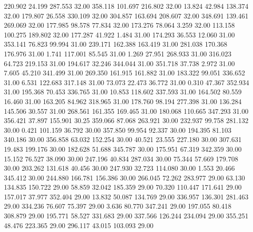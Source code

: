  220.902   24.199  287.553        32.00
 358.118  101.697  216.802        32.00
  13.824   42.984  138.374        32.00
 179.807   26.558  330.109        32.00
 304.857  163.694  208.607        32.00
 348.691  139.461  269.069        32.00
 177.985   98.578   77.834        32.00
 173.276   78.064    3.259        32.00
 113.158  100.275  189.802        32.00
 177.287   41.922    1.484        31.00
 174.293   36.553   12.060        31.00
 353.141   76.823   99.994        31.00
 239.171  162.388  163.419        31.00
 281.038  170.368  176.976        31.00
   1.741  117.001   85.545        31.00
   1.269   27.951  268.933        31.00
 316.023   64.723  219.153        31.00
 194.617   32.246  344.044        31.00
 351.718   37.738    2.972        31.00
   7.605   45.210  341.499        31.00
 269.350  161.915  161.882        31.00
 183.322   99.051  336.652        31.00
   6.531  122.683  317.148        31.00
  73.073   22.473   36.772        31.00
   0.310   47.367  352.934        31.00
 195.368   70.453  336.765        31.00
  10.853  118.602  337.593        31.00
 164.502   80.559   16.460        31.00
 163.205   84.962  318.965        31.00
 178.760   98.194  277.398        31.00
 136.284  145.506   30.557        31.00
 268.561  161.355  169.465        31.00
 180.068  110.665  347.293        31.00
 356.421   37.897  155.901        30.25
 359.066   87.068  263.921        30.00
 232.937   99.758  281.132        30.00
   0.421  101.159   36.792        30.00
 357.850   99.954   92.337        30.00
 194.395   81.103  340.186        30.00
 356.858   63.032  152.254        30.00
  40.521   23.555  227.180        30.00
 307.631   19.483  199.176        30.00
 182.628   51.688  345.787        30.00
 175.951   67.319  342.359        30.00
  15.152   76.527   38.090        30.00
 247.196   40.834  287.034        30.00
  75.344   57.669  179.708        30.00
 203.262  131.618   40.456        30.00
 247.930   32.723  114.080        30.00
   1.553   20.466  345.412        30.00
 244.880  166.781  156.386        30.00
 266.045   72.262  283.977        29.00
  63.130  134.835  150.722        29.00
  58.859   32.042  185.359        29.00
  70.320  110.447  171.641        29.00
 157.017   37.977  352.404        29.00
  13.832   50.087  134.769        29.00
 336.957  136.301  281.463        29.00
 334.236   76.607   75.397        29.00
   3.636   80.770  347.241        29.00
 197.055   80.418  308.879        29.00
 195.771   58.527  331.683        29.00
 337.566  126.244  234.094        29.00
 355.251   48.476  223.365        29.00
 296.117   43.015  103.093        29.00
